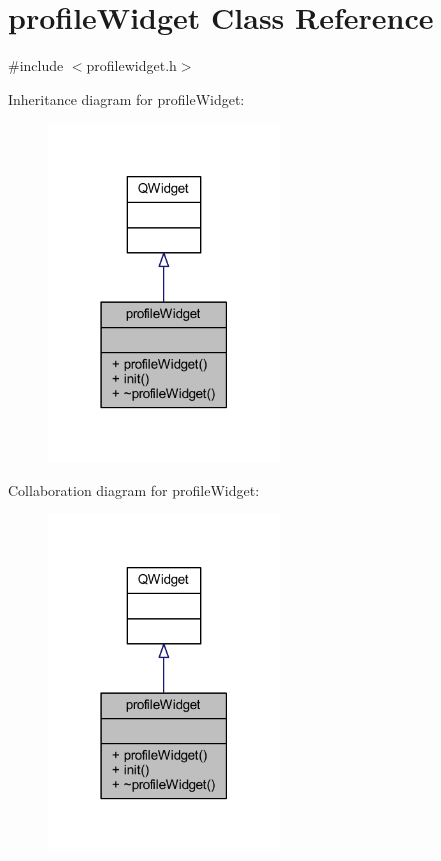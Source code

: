 \hypertarget{classprofile_widget}{}\section{profile\+Widget Class Reference}
\label{classprofile_widget}


{\ttfamily \#include $<$profilewidget.\+h$>$}



Inheritance diagram for profile\+Widget\+:
\nopagebreak
\begin{figure}[H]
\begin{center}
\leavevmode
\includegraphics[width=174pt]{classprofile_widget__inherit__graph}
\end{center}
\end{figure}


Collaboration diagram for profile\+Widget\+:
\nopagebreak
\begin{figure}[H]
\begin{center}
\leavevmode
\includegraphics[width=174pt]{classprofile_widget__coll__graph}
\end{center}
\end{figure}
